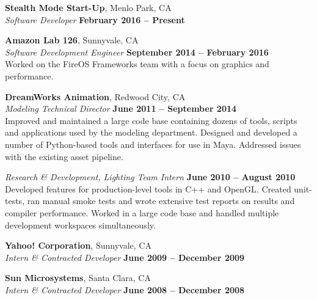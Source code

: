 \documentclass[margin,line]{resume}
\begin{document}
\begin{resume}
    \textbf{\listing Stealth Mode Start-Up}, Menlo Park, CA \vspace{2mm}\\\vspace{1mm}%
    \textsl{Software Developer} \hfill \textbf{February 2016 -- Present}


    \textbf{\listing Amazon Lab 126}, Sunnyvale, CA \vspace{2mm}\\\vspace{1mm}%
    \textsl{Software Development Engineer} \hfill \textbf{September 2014 -- February 2016}\\
    Worked on the FireOS Frameworks team with a focus on graphics and performance.

    \textbf{\listing DreamWorks Animation}, Redwood City, CA \vspace{2mm}\\\vspace{1mm}%
    \textsl{Modeling Technical Director} \hfill \textbf{June 2011 -- September 2014}\\
    Improved and maintained a large code base containing dozens of tools, scripts and applications used by the modeling department.
    Designed and developed a number of Python-based tools and interfaces for use in Maya.  Addressed issues with the existing asset pipeline. \vspace{1mm}

    \textsl{Research \& Development, Lighting Team Intern} \vspace{2mm}\hfill \textbf{June 2010 -- August 2010}\\
    Developed features for production-level tools in C++ and OpenGL.
    Created unit-tests, ran manual smoke tests and wrote extensive test reports on results and compiler performance.
    Worked in a large code base and handled multiple development workspaces simultaneously.

    \textbf{\listing Yahoo! Corporation}, Sunnyvale, CA \vspace{2mm}\\\vspace{1mm}%
    \textsl{Intern \& Contracted Developer} \hfill \textbf{June 2009 -- December 2009}

    \textbf{\listing Sun Microsystems}, Santa Clara, CA \vspace{2mm}\\\vspace{1mm}%
    \textsl{Intern \& Contracted Developer} \hfill \textbf{June 2008 -- December 2008}


\end{resume}
\end{document}

